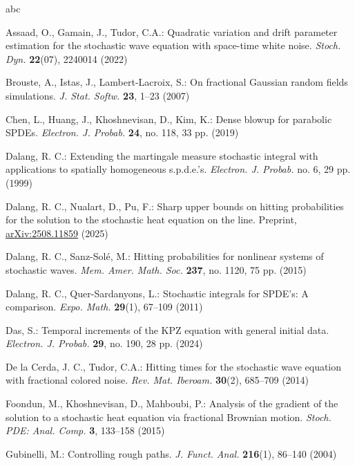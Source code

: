 \documentclass[11pt,reqno]{amsart}
\numberwithin{equation}{section}
\newcommand{\1}{{\bf 1}}
\newcommand{\2}{{\bf 2}}
\begin{document}
\begin{thebibliography}{abc}

Assaad, O., Gamain, J., Tudor, C.A.: Quadratic variation and drift parameter estimation for the stochastic wave equation with space-time white noise. 
\textit{Stoch. Dyn.} \textbf{22}(07), 2240014 (2022)

Brouste, A., Istas, J.,  Lambert-Lacroix, S.:   On fractional Gaussian random fields simulations. \textit{J. Stat. Softw.} {\bf 23}, 1--23  (2007)

Chen, L., Huang, J., Khoshnevisan, D., Kim, K.: Dense blowup for parabolic SPDEs. 
\textit{Electron. J. Probab.} \textbf{24},  no. 118, 33 pp. (2019)

Dalang, R. C.: Extending the martingale measure stochastic integral with applications to spatially homogeneous s.p.d.e.'s. 
\textit{Electron. J. Probab.}  no. 6, 29 pp. (1999)
 
 

Dalang, R. C., Nualart, D., Pu, F.: Sharp upper bounds on hitting probabilities for the solution to the stochastic heat equation on the line. Preprint, \href{https://doi.org/10.48550/arXiv.2508.11859}{arXiv:2508.11859} (2025)
 

Dalang, R. C., Sanz-Sol\'e, M.: Hitting probabilities for nonlinear systems of stochastic waves. 
\textit{Mem. Amer. Math. Soc.} \textbf{237}, no. 1120, 75 pp. (2015)

Dalang, R. C., Quer-Sardanyons, L.: Stochastic integrals for SPDE's: A comparison. 
\textit{Expo. Math.} \textbf{29}(1), 67--109 (2011)

Das, S.: Temporal increments of the KPZ equation with general initial data. 
\textit{Electron. J. Probab.} \textbf{29},  no. 190, 28 pp. (2024)

De la Cerda, J. C., Tudor, C.A.: Hitting times for the stochastic wave equation with fractional colored noise. 
\textit{Rev. Mat. Iberoam.} \textbf{30}(2), 685--709 (2014)

Foondun, M., Khoshnevisan, D., Mahboubi, P.: Analysis of the gradient of the solution to a stochastic heat equation via fractional Brownian motion. 
\textit{Stoch. PDE: Anal. Comp.} \textbf{3}, 133--158 (2015)

Gubinelli, M.: Controlling rough paths. \textit{J. Funct. Anal.} \textbf{216}(1), 86--140 (2004)


\end{thebibliography}
\end{document}
